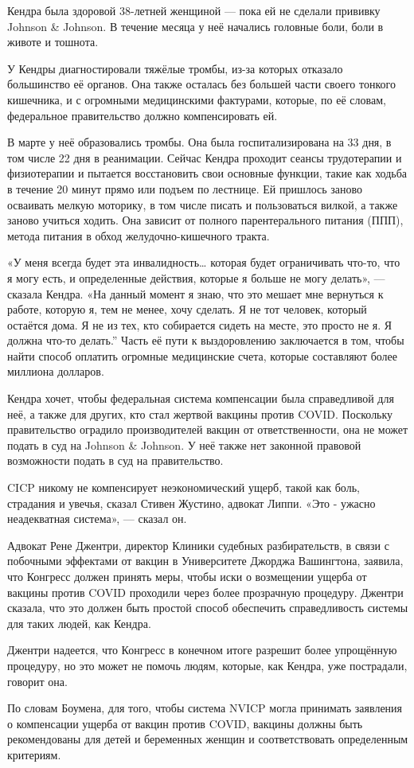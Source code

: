 Кендра была здоровой 38-летней женщиной — пока ей не сделали прививку Johnson \&
Johnson. В течение месяца у неё начались головные боли, боли в животе и тошнота.

У Кендры диагностировали тяжёлые тромбы, из-за которых отказало большинство её
органов. Она также осталась без большей части своего тонкого кишечника, и с
огромными медицинскими фактурами, которые, по её словам, федеральное
правительство должно компенсировать ей.

В марте у неё образовались тромбы. Она была госпитализирована на 33 дня, в том
числе 22 дня в реанимации. Сейчас Кендра проходит сеансы трудотерапии и
физиотерапии и пытается восстановить свои основные функции, такие как ходьба в
течение 20 минут прямо или подъем по лестнице. Ей пришлось заново осваивать
мелкую моторику, в том числе писать и пользоваться вилкой, а также заново
учиться ходить. Она зависит от полного парентерального питания (ППП), метода
питания в обход желудочно-кишечного тракта.

«У меня всегда будет эта инвалидность… которая будет ограничивать что-то, что я
могу есть, и определенные действия, которые я больше не могу делать», — сказала
Кендра. «На данный момент я знаю, что это мешает мне вернуться к работе, которую
я, тем не менее, хочу сделать. Я не тот человек, который остаётся дома. Я не из
тех, кто собирается сидеть на месте, это просто не я. Я должна что-то делать.''
Часть её пути к выздоровлению заключается в том, чтобы найти способ оплатить
огромные медицинские счета, которые составляют более миллиона долларов.

Кендра хочет, чтобы федеральная система компенсации была справедливой для неё, а
также для других, кто стал жертвой вакцины против COVID. Поскольку правительство
оградило производителей вакцин от ответственности, она не может подать в суд на
Johnson \& Johnson. У неё также нет законной правовой возможности подать в суд
на правительство.

CICP никому не компенсирует неэкономический ущерб, такой как боль, страдания и
увечья, сказал Стивен Жустино, адвокат Липпи. «Это - ужасно неадекватная
система», — сказал он.

Адвокат Рене Джентри, директор Клиники судебных разбирательств, в связи с
побочными эффектами от вакцин в Университете Джорджа Вашингтона, заявила, что
Конгресс должен принять меры, чтобы иски о возмещении ущерба от вакцины против
COVID проходили через более прозрачную процедуру. Джентри сказала, что это
должен быть простой способ обеспечить справедливость системы для таких людей,
как Кендра.

Джентри надеется, что Конгресс в конечном итоге разрешит более упрощённую
процедуру, но это может не помочь людям, которые, как Кендра, уже пострадали,
говорит она.

По словам Боумена, для того, чтобы система NVICP могла принимать заявления о
компенсации ущерба от вакцин против COVID, вакцины должны быть рекомендованы для
детей и беременных женщин и соответствовать определенным критериям.
